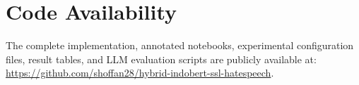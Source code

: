 \section*{Code Availability}

The complete implementation, annotated notebooks, experimental configuration files, result tables, and LLM evaluation scripts are publicly available at:
\url{https://github.com/shoffan28/hybrid-indobert-ssl-hatespeech}.
